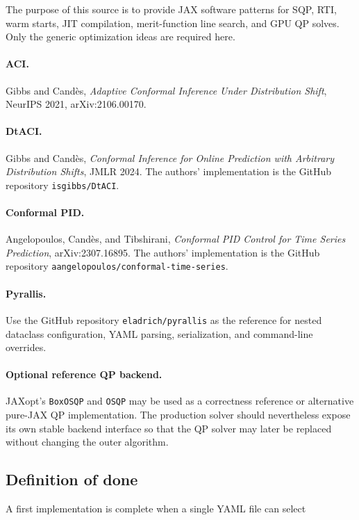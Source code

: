 \documentclass[11pt]{article}
\begin{document}
The purpose of this source is to provide JAX software patterns for SQP, RTI,
warm starts, JIT compilation, merit-function line search, and GPU QP solves.
Only the generic optimization ideas are required here.

\paragraph{ACI.}
Gibbs and Cand\`es,
\emph{Adaptive Conformal Inference Under Distribution Shift},
NeurIPS 2021, arXiv:2106.00170.

\paragraph{DtACI.}
Gibbs and Cand\`es,
\emph{Conformal Inference for Online Prediction with Arbitrary Distribution
Shifts}, JMLR 2024.
The authors' implementation is the GitHub repository
\texttt{isgibbs/DtACI}.

\paragraph{Conformal PID.}
Angelopoulos, Cand\`es, and Tibshirani,
\emph{Conformal PID Control for Time Series Prediction},
arXiv:2307.16895.
The authors' implementation is the GitHub repository
\texttt{aangelopoulos/conformal-time-series}.

\paragraph{Pyrallis.}
Use the GitHub repository
\texttt{eladrich/pyrallis}
as the reference for nested dataclass configuration, YAML parsing,
serialization, and command-line overrides.

\paragraph{Optional reference QP backend.}
JAXopt's \texttt{BoxOSQP} and \texttt{OSQP} may be used as a correctness
reference or alternative pure-JAX QP implementation.  The production solver
should nevertheless expose its own stable backend interface so that the QP
solver may later be replaced without changing the outer algorithm.

\subsection{Definition of done}

A first implementation is complete when a single YAML file can select
\end{document}
